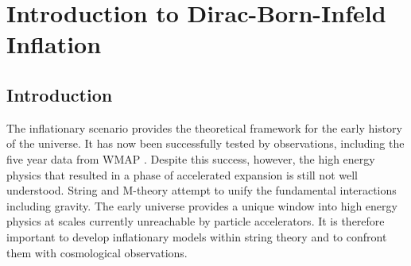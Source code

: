 \renewcommand{\CVSrevision}{\version$Id: dbi-intro.tex,v 1.66 2009/12/07 16:43:29 ith Exp $}
\chapter{Introduction to Dirac-Born-Infeld Inflation}
\label{ch:dbi-intro}

\section{Introduction}
% 
\label{sec:dbi-intro}


The inflationary scenario provides the 
theoretical framework for the early history 
of the universe. It has now been successfully tested by observations, 
including the five year data from WMAP
\cite{Komatsu:2008hk}. Despite this success, however, the high energy 
physics that resulted in a phase of accelerated expansion is still 
not well understood. String and M-theory attempt to unify the fundamental
interactions 
including gravity. 
The early universe provides a unique window into high energy physics at scales currently
unreachable by particle accelerators.
It is therefore important to 
develop inflationary models within string theory and to confront them with 
cosmological observations.

 

